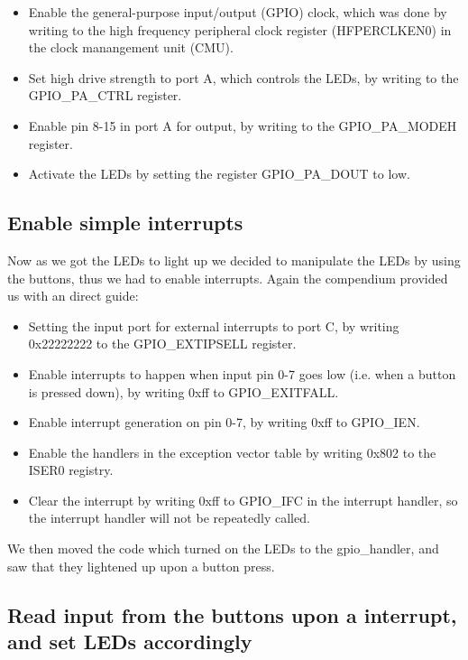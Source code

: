 \begin{itemize}
 	\item 	Enable the general-purpose input/output (GPIO) clock, which was done by writing to the high frequency peripheral clock register (HFPERCLKEN0) in the clock manangement unit (CMU). 
 	\item 	Set high drive strength to port A, which controls the LEDs, by writing to the GPIO\_PA\_CTRL register.
 	\item 	Enable pin 8-15 in port A for output, by writing to the GPIO\_PA\_MODEH register.
 	\item 	Activate the LEDs by setting the register GPIO\_PA\_DOUT to low. 
\end{itemize}

\subsection{Enable simple interrupts}

Now as we got the LEDs to light up we decided to manipulate the LEDs by using the buttons, thus we had to enable interrupts. Again the compendium provided us with an direct guide:

\begin{itemize}
	\item Setting the input port for external interrupts to port C, by writing 0x22222222 to the GPIO\_EXTIPSELL register. 
	\item Enable interrupts to happen when input pin 0-7 goes low (i.e. when a button is pressed down), by writing 0xff to GPIO\_EXITFALL. 
	\item Enable interrupt generation on pin 0-7, by writing 0xff to GPIO\_IEN.
	\item Enable the handlers in the exception vector table by writing 0x802 to the ISER0 registry. 
	\item Clear the interrupt by writing 0xff to GPIO\_IFC in the interrupt handler, so the interrupt handler will not be repeatedly called.
\end{itemize}

We then moved the code which turned on the LEDs to the gpio\_handler, and saw that they lightened up upon a button press.

\subsection{Read input from the buttons upon a interrupt, and set LEDs accordingly}

